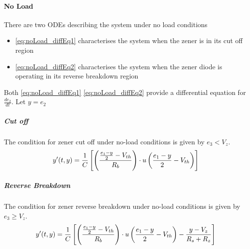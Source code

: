 \paragraph{No Load}
There are two ODEs describing the system under no load conditions
\begin{itemize}
	\item \eqref{eq:noLoad_diffEq1} characterises the system when the zener is in its cut off region
	\item \eqref{eq:noLoad_diffEq2} characterises the system when the zener diode is operating in its reverse breakdown region
\end{itemize}
Both \eqref{eq:noLoad_diffEq1} \eqref{eq:noLoad_diffEq2} provide a differential equation for $\frac{de_2}{dt}$. Let $y = e_2$

\subparagraph{Cut off}
The condition for zener cut off under no-load conditions is given by $e_3 < V_z$.
\begin{equation}
	y'(t,y) = \frac{1}{C} \left[\left(\frac{\frac{e_1 - y}{2} - V_{th}}{R_b} \right) \cdot u\left(\frac{e_1-y}{2}-V_{th} \right) \right]
\end{equation}
\subparagraph{Reverse Breakdown}
The condition for zener reverse breakdown under no-load conditions is given by $e_3 \geq V_z$.  
\begin{equation}
	y'(t,y) = \frac{1}{C}\left[\left(\frac{\frac{e_1 - y}{2} - V_{th}}{R_b} \right)\cdot u\left(\frac{e_1 - y}{2} - V_{th} \right)-\frac{y-V_z}{R_s+R_z} \right]
\end{equation}